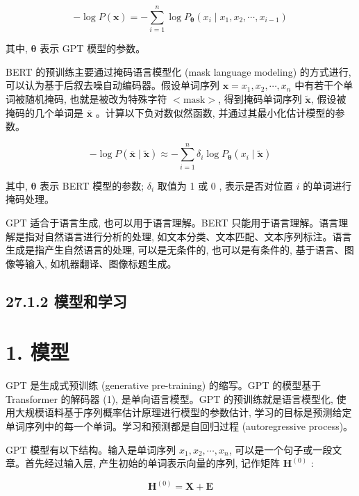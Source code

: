 \documentclass[10pt]{article}
\begin{document}
\begin{equation*}
-\log P(\boldsymbol{x})=-\sum_{i=1}^{n} \log P_{\boldsymbol{\theta}}\left(x_{i} \mid x_{1}, x_{2}, \cdots, x_{i-1}\right) \tag{27.3}
\end{equation*}


其中, $\boldsymbol{\theta}$ 表示 GPT 模型的参数。

BERT 的预训练主要通过掩码语言模型化 (mask language modeling) 的方式进行, 可以认为基于后叙去噪自动编码器。假设单词序列 $\boldsymbol{x}=x_{1}, x_{2}, \cdots, x_{n}$ 中有若干个单词被随机掩码, 也就是被改为特殊字符 $<\mathrm{mask}>$, 得到掩码单词序列 $\tilde{\boldsymbol{x}}$, 假设被掩码的几个单词是 $\overline{\boldsymbol{x}}$ 。计算以下负对数似然函数, 并通过其最小化估计模型的参数。


\begin{equation*}
-\log P(\overline{\boldsymbol{x}} \mid \tilde{\boldsymbol{x}}) \approx-\sum_{i=1}^{n} \delta_{i} \log P_{\boldsymbol{\theta}}\left(x_{i} \mid \tilde{\boldsymbol{x}}\right) \tag{27.4}
\end{equation*}


其中, $\boldsymbol{\theta}$ 表示 BERT 模型的参数; $\delta_{i}$ 取值为 1 或 0 , 表示是否对位置 $i$ 的单词进行掩码处理。

GPT 适合于语言生成, 也可以用于语言理解。BERT 只能用于语言理解。语言理解是指对自然语言进行分析的处理, 如文本分类、文本匹配、文本序列标注。语言生成是指产生自然语言的处理, 可以是无条件的, 也可以是有条件的, 基于语言、图像等输入, 如机器翻译、图像标题生成。

\subsection*{27.1.2 模型和学习}
\section*{1. 模型}
GPT 是生成式预训练 (generative pre-training) 的缩写。GPT 的模型基于 Transformer 的解码器 (1), 是单向语言模型。GPT 的预训练就是语言模型化, 使用大规模语料基于序列概率估计原理进行模型的参数估计, 学习的目标是预测给定单词序列中的每一个单词。学习和预测都是自回归过程 (autoregressive process)。

GPT 模型有以下结构。输入是单词序列 $x_{1}, x_{2}, \cdots, x_{n}$, 可以是一个句子或一段文章。首先经过输入层, 产生初始的单词表示向量的序列, 记作矩阵 $\boldsymbol{H}^{(0)}$ :


\begin{equation*}
\boldsymbol{H}^{(0)}=\boldsymbol{X}+\boldsymbol{E} \tag{27.5}
\end{equation*}
\end{document}
